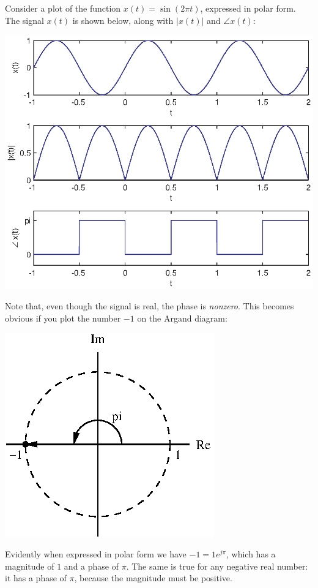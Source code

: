 \documentclass[10pt]{beamer}
\begin{document}
Consider a plot of the function $x(t) = \sin(2 \pi t)$, expressed in polar form.  The signal $x(t)$ is shown below, along with $|x(t)|$ and $\angle x(t)$:
\begin{center}
  \includegraphics{sinmagphase}
\end{center}
Note that, even though the signal is real, the phase is {\em nonzero}.  This becomes obvious if you plot the number $-1$ on the Argand diagram:  
\begin{center}
  \includegraphics{sinmagphasead}
\end{center}
Evidently when expressed in polar form we have $-1 = 1 e^{j \pi}$, which has a magnitude of $1$ and a phase of $\pi$.  The same is true for any negative real number:  it has a phase of $\pi$, because the magnitude must be positive.  
\end{document}
